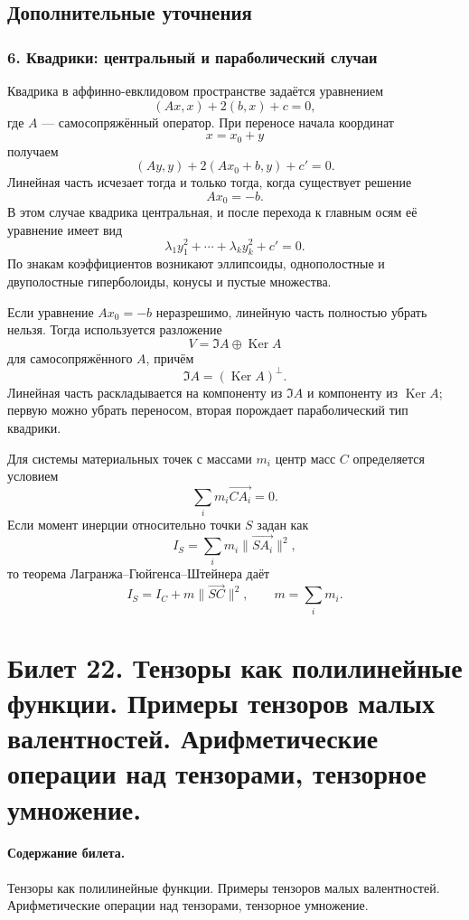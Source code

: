 \documentclass[12pt,a4paper]{article}
\theoremstyle{definition}
\theoremstyle{plain}
\theoremstyle{remark}
\newcommand{\Ker}{\operatorname{Ker}}
\begin{document}
\subsection*{Дополнительные уточнения}

\subsubsection*{6. Квадрики: центральный и параболический случаи}
Квадрика в аффинно-евклидовом пространстве задаётся уравнением
\[
    (Ax,x)+2(b,x)+c=0,
\]
где $A$ --- самосопряжённый оператор.
При переносе начала координат
\[
    x=x_0+y
\]
получаем
\[
    (Ay,y)+2(Ax_0+b,y)+c'=0.
\]
Линейная часть исчезает тогда и только тогда, когда существует решение
\[
    Ax_0=-b.
\]
В этом случае квадрика центральная, и после перехода к главным осям её уравнение имеет вид
\[
    \lambda_1 y_1^2+\cdots+\lambda_k y_k^2+c'=0.
\]
По знакам коэффициентов возникают эллипсоиды, однополостные и двуполостные гиперболоиды, конусы и пустые множества.

Если уравнение $Ax_0=-b$ неразрешимо, линейную часть полностью убрать нельзя. Тогда используется разложение
\[
    V=\Im A\oplus \Ker A
\]
для самосопряжённого $A$, причём
\[
    \Im A=(\Ker A)^\perp.
\]
Линейная часть раскладывается на компоненту из $\Im A$ и компоненту из $\Ker A$; первую можно убрать переносом, вторая порождает параболический тип квадрики.

Для системы материальных точек с массами $m_i$ центр масс $C$ определяется условием
\[
    \sum_i m_i\overrightarrow{CA_i}=0.
\]
Если момент инерции относительно точки $S$ задан как
\[
    I_S=\sum_i m_i\|\overrightarrow{SA_i}\|^2,
\]
то теорема Лагранжа--Гюйгенса--Штейнера даёт
\[
    I_S=I_C+m\|\overrightarrow{SC}\|^2,
    \qquad
    m=\sum_i m_i.
\]

\clearpage

\section{Билет 22. Тензоры как полилинейные функции. Примеры тензоров малых валентностей. Арифметические операции над тензорами, тензорное умножение.}

\paragraph{Содержание билета.} Тензоры как полилинейные функции. Примеры тензоров малых валентностей. Арифметические операции над тензорами, тензорное умножение.
\end{document}
